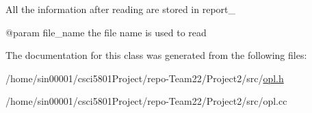 All the information after reading are stored in report\+\_\+ \begin{DoxyVerb}@param file_name the file name is used to read\end{DoxyVerb}
 

The documentation for this class was generated from the following files\+:\begin{DoxyCompactItemize}
\item 
/home/sin00001/csci5801\+Project/repo-\/\+Team22/\+Project2/src/\hyperlink{opl_8h}{opl.\+h}\item 
/home/sin00001/csci5801\+Project/repo-\/\+Team22/\+Project2/src/opl.\+cc\end{DoxyCompactItemize}
